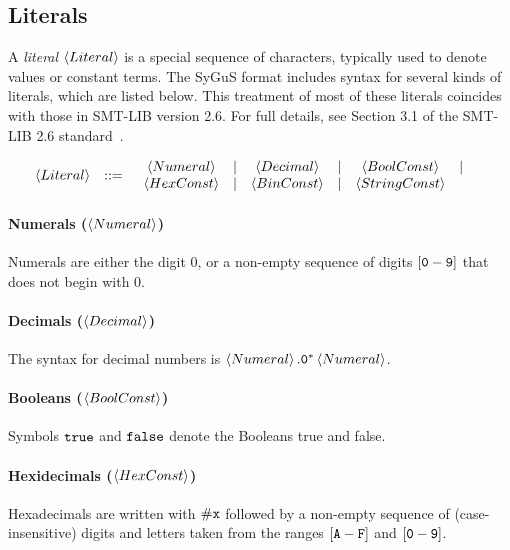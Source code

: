 \documentclass[english,a4paper,10pt]{article}
\begin{document}
\subsection{Literals}
\label{ssec:literals}

A \emph{literal} $\left\langle Literal\right\rangle$ is a special sequence of characters,
typically used to denote values or constant terms.
The SyGuS format includes syntax for several kinds of literals,
which are listed below.
This treatment of most of these literals coincides with
those in SMT-LIB version 2.6.
For full details, see Section 3.1 of the SMT-LIB 2.6 standard~\cite{BarFT-RR-17}.

\begin{alignat*}{1}
 & \begin{array}{rcl}
\left\langle Literal\right\rangle & ::= & \begin{array}{ccccccccccc}
\left\langle Numeral\right\rangle & | & \left\langle Decimal\right\rangle & | & \left\langle BoolConst\right\rangle & | \\
\left\langle HexConst\right\rangle & | & \left\langle BinConst\right\rangle & | & \left\langle StringConst\right\rangle\end{array}\\
\end{array}
\end{alignat*}

\paragraph{Numerals ($\left\langle Numeral\right\rangle$)}
Numerals are
either the digit $0$,
or a non-empty sequence of digits $\left[{\tt 0}-{\tt 9}\right]$
that does not begin with $0$.

\paragraph{Decimals ($\left\langle Decimal\right\rangle$)}
The syntax for decimal numbers is $\left\langle Numeral\right\rangle{\tt .0^{*}}\left\langle Numeral\right\rangle$.

\paragraph{Booleans ($\left\langle BoolConst\right\rangle$)}
Symbols ${\tt true}$ and ${\tt false}$ denote the Booleans true and false.

\paragraph{Hexidecimals ($\left\langle HexConst\right\rangle$)}
Hexadecimals are written with ${\tt \#x}$
followed by a non-empty sequence of (case-insensitive) 
digits and letters taken from the ranges $\left[{\tt A}-{\tt F}\right]$
and $\left[{\tt 0}-{\tt 9}\right]$.
\end{document}
